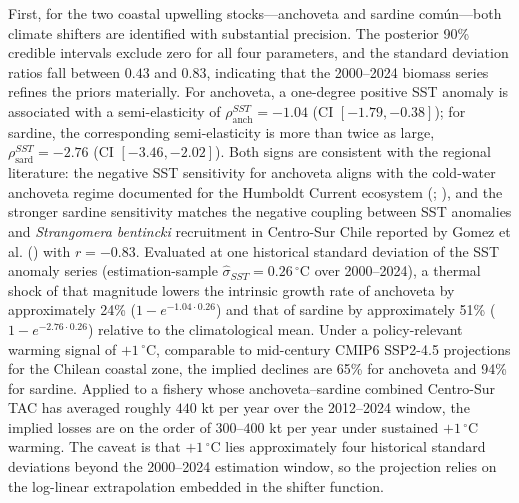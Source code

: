 \documentclass[
  11pt,
]{article}
\begin{document}
First, for the two coastal upwelling stocks---anchoveta and sardine
común---both climate shifters are identified with substantial precision.
The posterior 90\% credible intervals exclude zero for all four parameters,
and the standard deviation ratios fall between \(0.43\) and \(0.83\),
indicating that the 2000--2024 biomass series refines the priors
materially. For anchoveta, a one-degree positive SST anomaly is associated
with a semi-elasticity of \(\rho^{SST}_{\text{anch}} = -1.04\)
(CI \([-1.79, -0.38]\)); for sardine, the corresponding semi-elasticity
is more than twice as large, \(\rho^{SST}_{\text{sard}} = -2.76\)
(CI \([-3.46, -2.02]\)). Both signs are consistent with the regional literature: the negative SST sensitivity for anchoveta aligns with the cold-water anchoveta regime documented for the Humboldt Current ecosystem (; ), and the stronger sardine sensitivity matches the negative coupling between SST anomalies and \emph{Strangomera bentincki} recruitment in Centro-Sur Chile reported by Gomez et al. () with \(r=-0.83\). Evaluated at one historical standard deviation of
the SST anomaly series (estimation-sample \(\hat{\sigma}_{SST} =
0.26\,^{\circ}\text{C}\) over 2000--2024), a thermal shock of that magnitude
lowers the intrinsic growth rate of anchoveta by approximately 24\%
(\(1 - e^{-1.04 \cdot 0.26}\)) and that of sardine by approximately 51\%
(\(1 - e^{-2.76 \cdot 0.26}\)) relative to the climatological mean. Under a
policy-relevant warming signal of \(+1\,^{\circ}\text{C}\), comparable to
mid-century CMIP6 SSP2-4.5 projections for the Chilean coastal zone, the
implied declines are 65\% for anchoveta and 94\% for sardine. Applied
to a fishery whose anchoveta--sardine combined
Centro-Sur TAC has averaged roughly \(440\) kt per year over the 2012--2024
window, the implied losses are on the order of \(300\)--\(400\) kt per year
under sustained \(+1\,^{\circ}\text{C}\) warming. The caveat is that
\(+1\,^{\circ}\text{C}\) lies approximately four historical standard
deviations beyond the 2000--2024 estimation window, so the projection
relies on the log-linear extrapolation embedded in the shifter function.
\end{document}
